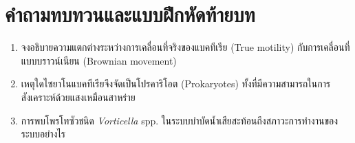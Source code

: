 \section{คำถามทบทวนและแบบฝึกหัดท้ายบท}
\begin{enumerate}
    \item จงอธิบายความแตกต่างระหว่างการเคลื่อนที่จริงของแบคทีเรีย (True motility) กับการเคลื่อนที่แบบบราวน์เนียน (Brownian movement)
    \item เหตุใดไซยาโนแบคทีเรียจึงจัดเป็นโปรคาริโอต (Prokaryotes) ทั้งที่มีความสามารถในการสังเคราะห์ด้วยแสงเหมือนสาหร่าย
    \item การพบโพรโทซัวชนิด \textit{Vorticella} spp. ในระบบบำบัดน้ำเสียสะท้อนถึงสภาวะการทำงานของระบบอย่างไร
\end{enumerate}
